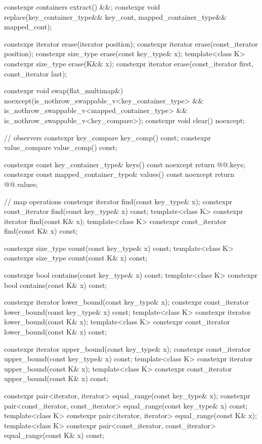 \begin{codeblock}
{{    constexpr containers extract() &&;
    constexpr void replace(key_container_type&& key_cont, mapped_container_type&& mapped_cont);

    constexpr iterator erase(iterator position);
    constexpr iterator erase(const_iterator position);
    constexpr size_type erase(const key_type& x);
    template<class K> constexpr size_type erase(K&& x);
    constexpr iterator erase(const_iterator first, const_iterator last);

    constexpr void swap(flat_multimap&)
      noexcept(is_nothrow_swappable_v<key_container_type> &&
               is_nothrow_swappable_v<mapped_container_type> &&
               is_nothrow_swappable_v<key_compare>);
    constexpr void clear() noexcept;

    // observers
    constexpr key_compare key_comp() const;
    constexpr value_compare value_comp() const;

    constexpr const key_container_type& keys() const noexcept { return @@.keys; }
    constexpr const mapped_container_type& values() const noexcept { return @@.values; }

    // map operations
    constexpr iterator find(const key_type& x);
    constexpr const_iterator find(const key_type& x) const;
    template<class K> constexpr iterator find(const K& x);
    template<class K> constexpr const_iterator find(const K& x) const;

    constexpr size_type count(const key_type& x) const;
    template<class K> constexpr size_type count(const K& x) const;

    constexpr bool contains(const key_type& x) const;
    template<class K> constexpr bool contains(const K& x) const;

    constexpr iterator lower_bound(const key_type& x);
    constexpr const_iterator lower_bound(const key_type& x) const;
    template<class K> constexpr iterator lower_bound(const K& x);
    template<class K> constexpr const_iterator lower_bound(const K& x) const;

    constexpr iterator upper_bound(const key_type& x);
    constexpr const_iterator upper_bound(const key_type& x) const;
    template<class K> constexpr iterator upper_bound(const K& x);
    template<class K> constexpr const_iterator upper_bound(const K& x) const;

    constexpr pair<iterator, iterator> equal_range(const key_type& x);
    constexpr pair<const_iterator, const_iterator> equal_range(const key_type& x) const;
    template<class K>
      constexpr pair<iterator, iterator> equal_range(const K& x);
    template<class K>
      constexpr pair<const_iterator, const_iterator> equal_range(const K& x) const;

}}
\end{codeblock}
